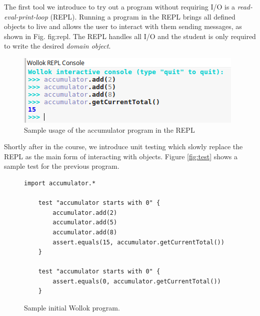 The first tool we introduce to try out a program without requiring I/O is a \emph {read-eval-print-loop} (REPL). Running a program in the REPL brings all defined objects to live and allows the user to interact with them sending messages, as shown in Fig. {fig:repl}. 
The REPL handles all I/O and the student is only required to write the desired \emph{domain object}.

\begin{figure}[ht]
 \centering
 \includegraphics[scale=0.6]{images/accumulator-repl.png}
 \caption{\small Sample usage of the accumulator program in the REPL}
 \label{fig:repl}
\end{figure}




Shortly after in the course, we introduce unit testing which slowly replace the REPL as the main form of interacting with objects. Figure \ref{fig:test} shows a sample test for the previous program. 

\begin{figure}[ht]
 \centering
 \begin{lstlisting}[language=Wollok]
 	import accumulator.*

	test "accumulator starts with 0" {
		accumulator.add(2)
		accumulator.add(5)
		accumulator.add(8)
		assert.equals(15, accumulator.getCurrentTotal())		
	}
   
	test "accumulator starts with 0" {
		assert.equals(0, accumulator.getCurrentTotal())
	}
 \end{lstlisting}
 
 \caption{\small Sample initial Wollok program.}
 \label{fig:helloWorld/wollok}
\end{figure}

